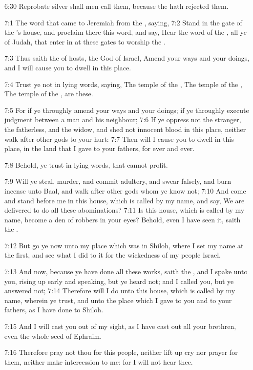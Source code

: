 6:30 Reprobate silver shall men call them, because the \LORD hath rejected them.

7:1 The word that came to Jeremiah from the \LORD, saying, 7:2 Stand in the gate of the \LORD's house, and proclaim there this word, and say, Hear the word of the \LORD, all ye of Judah, that enter in at these gates to worship the \LORD.

7:3 Thus saith the \LORD of hosts, the God of Israel, Amend your ways and your doings, and I will cause you to dwell in this place.

7:4 Trust ye not in lying words, saying, The temple of the \LORD, The temple of the \LORD, The temple of the \LORD, are these.

7:5 For if ye throughly amend your ways and your doings; if ye throughly execute judgment between a man and his neighbour; 7:6 If ye oppress not the stranger, the fatherless, and the widow, and shed not innocent blood in this place, neither walk after other gods to your hurt: 7:7 Then will I cause you to dwell in this place, in the land that I gave to your fathers, for ever and ever.

7:8 Behold, ye trust in lying words, that cannot profit.

7:9 Will ye steal, murder, and commit adultery, and swear falsely, and burn incense unto Baal, and walk after other gods whom ye know not; 7:10 And come and stand before me in this house, which is called by my name, and say, We are delivered to do all these abominations?  7:11 Is this house, which is called by my name, become a den of robbers in your eyes? Behold, even I have seen it, saith the \LORD.

7:12 But go ye now unto my place which was in Shiloh, where I set my name at the first, and see what I did to it for the wickedness of my people Israel.

7:13 And now, because ye have done all these works, saith the \LORD, and I spake unto you, rising up early and speaking, but ye heard not; and I called you, but ye answered not; 7:14 Therefore will I do unto this house, which is called by my name, wherein ye trust, and unto the place which I gave to you and to your fathers, as I have done to Shiloh.

7:15 And I will cast you out of my sight, as I have cast out all your brethren, even the whole seed of Ephraim.

7:16 Therefore pray not thou for this people, neither lift up cry nor prayer for them, neither make intercession to me: for I will not hear thee.

